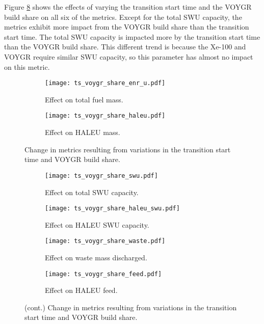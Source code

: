 Figure \ref{fig:ts_voygr_share} shows the effects of varying the 
transition start time and the VOYGR build share on all six of the 
metrics. Except for the total \gls{SWU} capacity, the metrics 
exhibit more impact from the VOYGR build share than the 
transition start time. The total \gls{SWU} capacity is impacted more 
by the transition start time than the VOYGR build share. This
different trend is because the Xe-100 and VOYGR require similar 
\gls{SWU} capacity, so this parameter has almost no impact on 
this metric. 

\begin{figure}
    \begin{subfigure}[h!]{0.48\textwidth}
        \centering
        \texttt{[image: ts\_voygr\_share\_enr\_u.pdf]}
        \caption{Effect on total fuel mass.}
        \label{fig:ts_voygr_share_enr_u}
    \end{subfigure}
    \hfill
    \begin{subfigure}[h!]{0.48\textwidth}
        \centering
        \texttt{[image: ts\_voygr\_share\_haleu.pdf]}
        \caption{Effect on HALEU mass.}
        \label{fig:ts_voygr_share_haleu}
    \end{subfigure}
    \caption{Change in metrics resulting from variations in the 
    transition start time and VOYGR build share.}
\end{figure}

\begin{figure}
    \ContinuedFloat
    \begin{subfigure}[h!]{0.48\textwidth}
        \centering
        \texttt{[image: ts\_voygr\_share\_swu.pdf]}
        \caption{Effect on total SWU capacity.}
        \label{fig:ts_voygr_share_swu}
    \end{subfigure}
    \hfill
    \begin{subfigure}[h!]{0.48\textwidth}
        \centering
        \texttt{[image: ts\_voygr\_share\_haleu\_swu.pdf]}
        \caption{Effect on HALEU SWU capacity.}
        \label{fig:ts_voygr_share_haleu_swu}
    \end{subfigure}
    
    \begin{subfigure}[h!]{0.48\textwidth}
        \centering
        \texttt{[image: ts\_voygr\_share\_waste.pdf]}
        \caption{Effect on waste mass discharged.}
        \label{fig:ts_voygr_share_waste}
    \end{subfigure}
    \hfill
    \begin{subfigure}[h!]{0.48\textwidth}
        \centering
        \texttt{[image: ts\_voygr\_share\_feed.pdf]}
        \caption{Effect on HALEU feed.}
        \label{fig:ts_voygr_share_feed}
    \end{subfigure}
    \caption{(cont.) Change in metrics resulting from variations in the 
    transition start time and VOYGR build share.}
    \label{fig:ts_voygr_share}
\end{figure}

